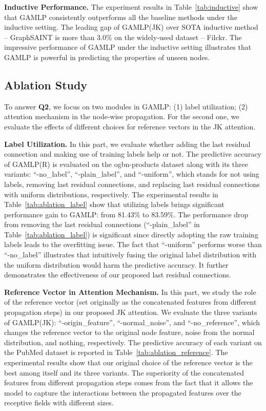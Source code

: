 \documentclass[sigconf]{acmart}
\begin{document}
\noindent\textbf{Inductive Performance.} 
The experiment results in Table~\ref{tab:inductive} show that GAMLP consistently outperforms all the baseline methods under the inductive setting.
The leading gap of GAMLP(JK) over SOTA inductive method -- GraphSAINT is more than 3.0\% on the widely-used dataset -- Filckr.
The impressive performance of GAMLP under the inductive setting illustrates that GAMLP is powerful in predicting the properties of unseen nodes.




\subsection{Ablation Study}
To answer \textbf{Q2}, we focus on two modules in GAMLP: (1) label utilization; (2) attention mechanism in the node-wise propagation.
For the second one, we evaluate the effects of different choices for reference vectors in the JK attention.


\noindent\textbf{Label Utilization.}
In this part, we evaluate whether adding the last residual connection and making use of training labels help or not.
The predictive accuracy of GAMLP(R) is evaluated on the ogbn-products dataset along with its three variants: ``-no\_label'', ``-plain\_label'', and ``-uniform'', which stands for not using labels, removing last residual connections, and replacing last residual connections with uniform distributions, respectively.
The experimental results in Table~\ref{tab:ablation_label} show that utilizing labels brings significant performance gain to GAMLP: from 81.43\% to 83.59\%.
The performance drop from removing the last residual connections (``-plain\_label'' in Table~\ref{tab:ablation_label}) is significant since directly adopting the raw training labels leads to the overfitting issue.
The fact that ``-uniform'' performs worse than ``-no\_label'' illustrates that intuitively fusing the original label distribution with the uniform distribution would harm the predictive accuracy.
It further demonstrates the effectiveness of our proposed last residual connections.

\noindent\textbf{Reference Vector in Attention Mechanism.} In this part, we study the role of the reference vector (set originally as the concatenated features from different propagation steps) in our proposed JK attention.
We evaluate the three variants of GAMLP(JK): ``-origin\_feature'', ``-normal\_noise'', and ``-no\_reference'', which changes the reference vector to the original node feature, noise from the normal distribution, and nothing, respectively.
The predictive accuracy of each variant on the PubMed dataset is reported in Table~\ref{tab:ablation_reference}.
The experimental results show that our original choice of the reference vector is the best among itself and its three variants.
The superiority of the concatenated features from different propagation steps comes from the fact that it allows the model to capture the interactions between the propagated features over the receptive fields with different sizes.
\end{document}
